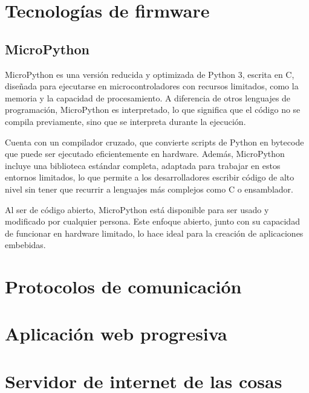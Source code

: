 \section{Tecnologías de firmware}

\subsection{MicroPython}

MicroPython es una versión reducida y optimizada de Python 3, escrita en C, diseñada para ejecutarse en microcontroladores con recursos limitados, como la memoria y  la capacidad de procesamiento. A diferencia de otros lenguajes de programación, MicroPython es interpretado, lo que significa que el código no se compila previamente, sino que se interpreta durante la ejecución.

Cuenta con un compilador cruzado, que convierte scripts de Python en bytecode que puede ser ejecutado eficientemente en hardware. Además, MicroPython incluye una biblioteca estándar completa, adaptada para trabajar en estos entornos limitados, lo que permite a los desarrolladores escribir código de alto nivel sin tener que recurrir a lenguajes más complejos como C o ensamblador.

Al ser de código abierto, MicroPython está disponible para ser usado y modificado por cualquier persona. Este enfoque abierto, junto con su capacidad de funcionar en hardware limitado, lo hace ideal para la creación de aplicaciones embebidas. \citep{micropython} \citep{infoMpy}


\section{Protocolos de comunicación}

\section{Aplicación web progresiva}


\section{Servidor de internet de las cosas}





